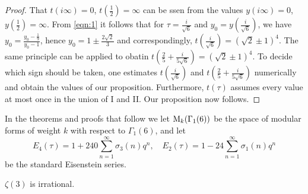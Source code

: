 \begin{proof}
That $t(i \infty) = 0$, $t(\frac{1}{2}) = \infty$ can be ssen from the values $y(i\infty) = 0$, $y(\frac{1}{2}) = \infty$.
From \eqref{eqn:1} it follows that for $\tau = \frac{i}{\sqrt{6}}$ and $y_0 = y(\frac{i}{\sqrt{6}})$, we have $y_0 = \frac{y_0 - \frac{1}{9}}{y_0 - 1}$, hence $y_0 = 1 \pm \frac{2 \sqrt{2}}{3}$ and correspondingly, $t(\frac{i}{\sqrt{6}}) = (\sqrt{2} \pm 1)^4$.
The same principle can be applied to obatin $t(\frac{2}{5} + \frac{i}{5\sqrt{6}}) = (\sqrt{2} \pm 1)^4$.
To decide which sign should be taken, one estimates $t(\frac{i}{\sqrt{6}})$ and $t(\frac{2}{5} + \frac{i}{5\sqrt{6}})$ numerically and obtain the values of our proposition.
Furthermore, $t(\tau)$ assumes every value at most once in the union of I and II.
Our proposition now follows.
\end{proof}

In the theorems and proofs that follow we let $\mathrm{M}_k(\Gamma_1(6))$ be the space of modular forms of weight $k$ with respect to $\Gamma_1(6)$, and let
$$
    E_4 (\tau) = 1 + 240 \sum_{n=1}^{\infty} \sigma_3(n) q^n, \quad E_2(\tau) = 1 - 24 \sum_{n=1}^{\infty} \sigma_1(n) q^n 
$$
be the standard Eisenstein series.

\begin{theorem}
    \label{thm:1}
    $\zeta(3)$ is irrational.
\end{theorem}

